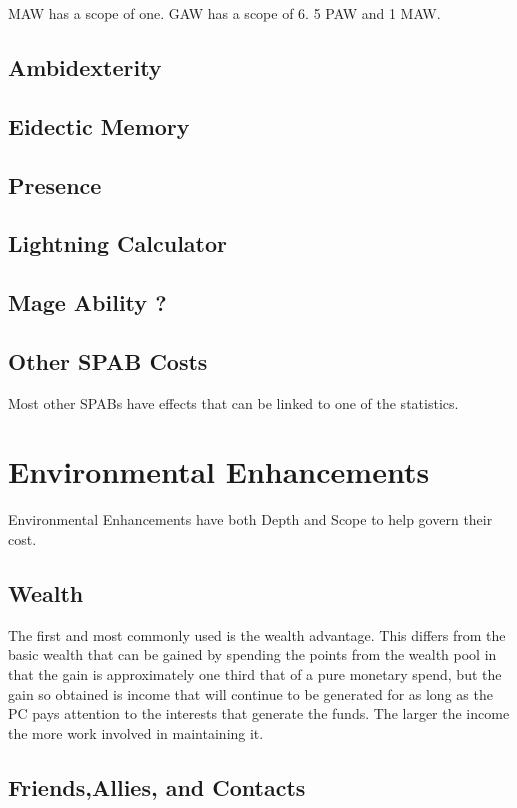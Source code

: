 MAW has a scope of one.
GAW has a scope of 6. 5 PAW and 1 MAW.

\subsection{Ambidexterity}
\subsection{Eidectic Memory}
\subsection{Presence}
\subsection{Lightning Calculator}
\subsection{Mage Ability ?}
\subsection{Other SPAB Costs}

Most other SPABs have effects that can be linked to one of the
statistics.

\section{Environmental Enhancements}

Environmental Enhancements have both Depth and Scope to help govern
their cost.

\subsection{Wealth}

The first and most commonly used is the wealth advantage. This differs
from the basic wealth that can be gained by spending the points from the
wealth pool in that the gain is approximately one third that of a pure
monetary spend, but the gain so obtained is income that will continue to
be generated for as long as the PC pays attention to the interests that
generate the funds. The larger the income the more work involved in
maintaining it.

\subsection{Friends,Allies, and Contacts}

